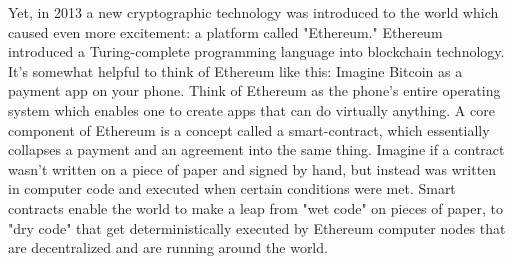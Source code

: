 \documentclass{article}
\begin{document}
Yet, in 2013 a new cryptographic technology was introduced to the world which caused even more excitement: a platform called "Ethereum." Ethereum introduced a Turing-complete programming language into blockchain technology. It's somewhat helpful to think of Ethereum like this: Imagine Bitcoin as a payment app on your phone. Think of Ethereum as the phone's entire operating system which enables one to create apps that can do virtually anything.
A core component of Ethereum is a concept called a \gls{smart-contract}, which essentially collapses a payment and an agreement into the same thing. Imagine if a contract wasn't written on a piece of paper and signed by hand, but instead was written in computer code and executed when certain conditions were met. Smart contracts enable the world to make a leap from "wet code" on pieces of paper, to "dry code" that get deterministically executed by Ethereum computer nodes that are decentralized and are running around the world.
\end{document}
